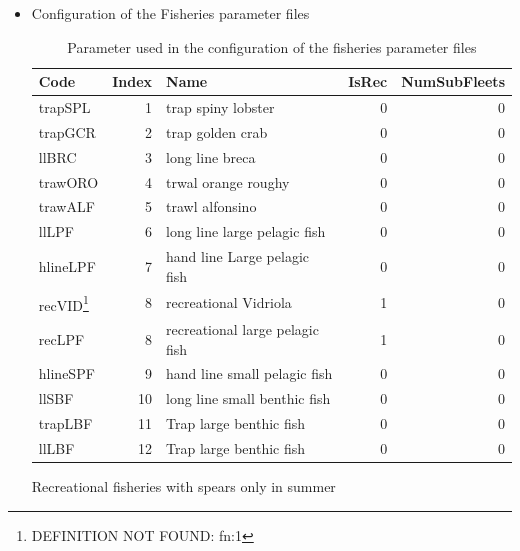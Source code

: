 \documentclass[11pt]{article}
\begin{document}
\begin{itemize}
\item Configuration of the Fisheries parameter files
\begin{table}[htb]
\caption{Parameter used in the configuration of the fisheries parameter files}
\begin{center}
\begin{tabular}{lrlrr}
 Code                                          &  Index  &  Name                             &  IsRec  &  NumSubFleets  \\
\hline
 trapSPL                                       &      1  &  trap spiny lobster               &      0  &             0  \\
 trapGCR                                       &      2  &  trap golden crab                 &      0  &             0  \\
 llBRC                                         &      3  &  long line breca                  &      0  &             0  \\
 trawORO                                       &      4  &  trwal orange roughy              &      0  &             0  \\
 trawALF                                       &      5  &  trawl alfonsino                  &      0  &             0  \\
 llLPF                                         &      6  &  long line large pelagic fish     &      0  &             0  \\
 hlineLPF                                      &      7  &  hand line Large pelagic fish     &      0  &             0  \\
 recVID\footnote{DEFINITION NOT FOUND: fn:1 }  &      8  &  recreational Vidriola            &      1  &             0  \\
 recLPF\footnotemark[1]                        &      8  &  recreational large pelagic fish  &      1  &             0  \\
 hlineSPF                                      &      9  &  hand line small pelagic fish     &      0  &             0  \\
 llSBF                                         &     10  &  long line small benthic fish     &      0  &             0  \\
 trapLBF                                       &     11  &  Trap large benthic fish          &      0  &             0  \\
 llLBF                                         &     12  &  Trap large benthic fish          &      0  &             0  \\
\end{tabular}
\end{center}
\end{table}

       \footnotemark[1] Recreational fisheries with spears only in summer
\end{itemize}
\end{document}
